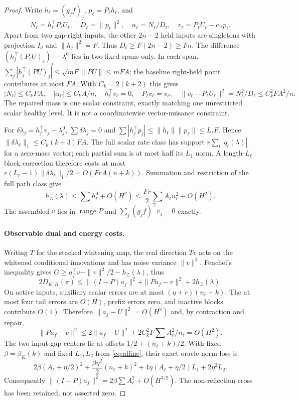 \documentclass[11pt]{article}
\begin{document}
\begin{proof}
Write $h_\ell=(g_jf)_j$, $p_\ell=P_\ell h_\ell$, and
\[
N_\ell=h_\ell^\top P_\ell U_\ell,\quad
D_\ell=\|p_\ell\|^2,\quad \alpha_\ell=N_\ell/D_\ell,\quad
v_\ell=P_\ell U_\ell-\alpha_\ell p_\ell .
\]
Apart from two gap-right inputs, the other $2n-2$ held inputs are singletons
with projection $I_d$ and $\|h_j\|^2=F$.
Thus $D_\ell\ge F(2n-2)\ge Fn$.
The difference $(h_j^\top(P_\ell U)_j)_j-\lambda^0$ lies in two fixed
spans only. In each span,
$\sum_j|h_j^\top(PU)_j|\le\sqrt{mF}\|PU\|\le mFA$;
the baseline right-held point contributes at most $FA$.
With $C_k=2(k+2)$ this gives
\[
|N_\ell|\le C_kFA,\quad |\alpha_\ell|\le C_kA/n,\quad
h_\ell^\top v_\ell=0,\quad P_\ell v_\ell=v_\ell,\quad
\|v_\ell-P_\ell U_\ell\|^2=N_\ell^2/D_\ell\le C_k^2FA^2/n .
\]
The repaired mass is one scalar constraint, exactly matching one unrestricted
scalar healthy level. It is not a coordinatewise vector-nuisance constraint.

For $\delta\lambda_j=h_j^\top v_j-\lambda_j^0$,
$\sum\delta\lambda_j=0$ and
$\sum|h_j^\top p_j|\le\|h_\ell\|\|p_\ell\|\le L_\ell F$.
Hence $\|\delta\lambda_\ell\|_1\le C_k(k+3)FA$.
The full scalar rate class has support $r\sum_t|q_t(\lambda)|$ for a zero-mass vector;
each partial sum is at most half its $L_1$ norm.
A length-$L_\ell$ block correction therefore costs
at most $r(L_\ell-1)\|\delta\lambda_\ell\|_1/2=O(FrA(n+k))$.
Summation and restriction of the full path class give
\begin{equation}\label{eq:support}
h_{\mathcal Z}(\lambda)\le\sum h_\ell^0+O(H^2)
\le\frac{Fr}{2}\sum A_\ell n_\ell^2+O(H^2).
\end{equation}
The assembled $v$ lies in $\operatorname{range}P$ and
$\sum_j(g_jf)^\top v_j=0$ exactly.

\paragraph{Observable dual and energy costs.}
Writing $T$ for the stacked whitening map, the real direction $Tv$
acts on the whitened conditional innovations and has noise variance
$\|v\|^2$. Fenchel's inequality gives
$G\ge a_f^\top v-\|v\|^2/2-h_{\mathcal Z}(\lambda)$, thus
\begin{equation}\label{eq:dual}
2D_{K,H}(\pi)\le
\|(I-P)a_f\|^2+\|Pa_f-v\|^2+2h_{\mathcal Z}(\lambda).
\end{equation}
On active inputs, auxiliary scalar errors are at most $(\eta+r)(n_\ell+k)$.
The at most four tail errors are $O(H)$, prefix errors zero, and inactive
blocks contribute $O(1)$.
Therefore $\|a_f-U\|^2=O(H^2)$ and, by contraction and repair,
\[
\|Pa_f-v\|^2\le2\|a_f-U\|^2+2C_k^2F\sum A_\ell^2/n_\ell=O(H^2).
\]
The two input-gap centers lie at offsets $1/2\pm(n_\ell+k)/2$.
With fixed $\beta=\beta_K(k)$ and fixed $L_1,L_2$ from \eqref{eq:affine},
their exact oracle norm loss is
\[
2\beta(A_\ell+\eta/2)^2+\frac{\beta\eta^2}{2}(n_\ell+k)^2
+4\eta(A_\ell+\eta/2)L_1+2\eta^2L_2 .
\]
Consequently $\|(I-P)a_f\|^2=2\beta\sum A_\ell^2+O(H^{3/2})$.
The non-reflection cross has been retained, not asserted zero.


\end{proof}
\end{document}

